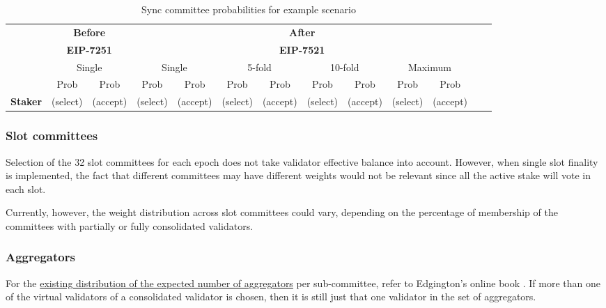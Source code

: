 \begin{table}[htp]
\caption{Sync committee probabilities for example scenario }
\begin{center}
\begin{tabular}{|l|c|c|c|c|c|c|c|c|c|c|c|c|}
\hline
& \multicolumn{2}{c|}{\textbf{Before }} & \multicolumn{8}{c|}{\textbf{After}} \\
& \multicolumn{2}{c|}{\textbf{EIP-7251}} & \multicolumn{8}{c|}{\textbf{EIP-7521}} \\
\cline{2-3} \cline{4-11} 
& \multicolumn{2}{c|}{Single} &  \multicolumn{2}{c|}{Single} & \multicolumn{2}{c|}{5-fold} &  \multicolumn{2}{c|}{10-fold} &  \multicolumn{2}{c|}{Maximum} \\
\cline{2-3} \cline{4-5} \cline{6-7} \cline{8-9} \cline{10-11}
 & Prob &  Prob  & Prob &  Prob  & Prob &  Prob & Prob &  Prob  & Prob &  Prob  \\
\textbf{Staker}  & (select) &  (accept)  & (select) &  (accept)  & (select) &  (accept) & (select) &  (accept)  & (select) &  (accept)  \\
\hline
\end{tabular}
\end{center}
\label{tbl:syncprobs}
\end{table}%


\subsubsection*{Slot committees}
Selection of the 32 slot committees for each epoch does not take validator effective balance into account. However, when single slot finality is implemented, the fact that different committees may have different weights would not be relevant since all the active stake will vote in each slot.

Currently, however, the weight distribution across slot committees could vary, depending on the percentage of membership of the committees with partially or fully consolidated validators.
\subsubsection*{Aggregators}
For the \href{https://eth2book.info/capella/part2/building_blocks/aggregator/}{existing distribution of the expected number of aggregators} per sub-committee, refer to Edgington's online book \cite{Edgington2023}.
If more than one of the virtual validators of a consolidated validator is chosen, then it is still just that one validator in the set of aggregators. 
